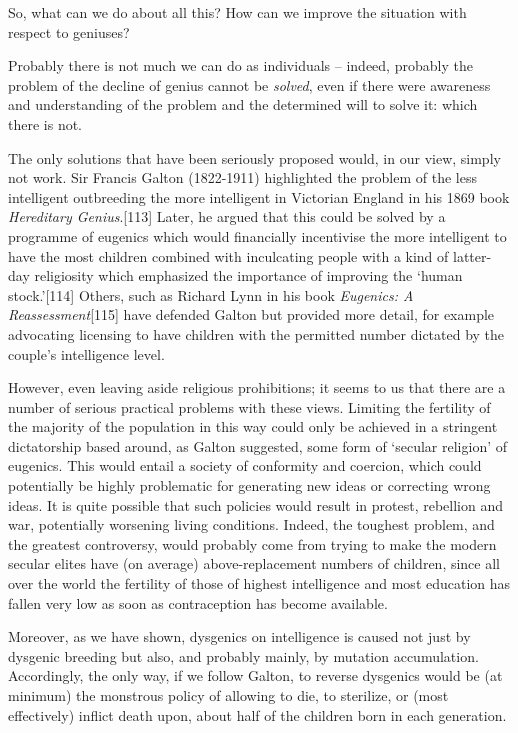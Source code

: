 \documentclass[
]{book}
\begin{document}
So, what can we do about all this? How can we improve the situation with respect to geniuses?

Probably there is not much we can do as individuals -- indeed, probably the problem of the decline of genius cannot be \emph{solved}, even if there were awareness and understanding of the problem and the determined will to solve it: which there is not.

The only solutions that have been seriously proposed would, in our view, simply not work. Sir Francis Galton (1822-1911) highlighted the problem of the less intelligent outbreeding the more intelligent in Victorian England in his 1869 book \emph{Hereditary Genius}.{[}113{]} Later, he argued that this could be solved by a programme of eugenics which would financially incentivise the more intelligent to have the most children combined with inculcating people with a kind of latter-day religiosity which emphasized the importance of improving the `human stock.'{[}114{]} Others, such as Richard Lynn in his book \emph{Eugenics: A Reassessment}{[}115{]} have defended Galton but provided more detail, for example advocating licensing to have children with the permitted number dictated by the couple's intelligence level.

However, even leaving aside religious prohibitions; it seems to us that there are a number of serious practical problems with these views. Limiting the fertility of the majority of the population in this way could only be achieved in a stringent dictatorship based around, as Galton suggested, some form of `secular religion' of eugenics. This would entail a society of conformity and coercion, which could potentially be highly problematic for generating new ideas or correcting wrong ideas. It is quite possible that such policies would result in protest, rebellion and war, potentially worsening living conditions. Indeed, the toughest problem, and the greatest controversy, would probably come from trying to make the modern secular elites have (on average) above-replacement numbers of children, since all over the world the fertility of those of highest intelligence and most education has fallen very low as soon as contraception has become available.

Moreover, as we have shown, dysgenics on intelligence is caused not just by dysgenic breeding but also, and probably mainly, by mutation accumulation. Accordingly, the only way, if we follow Galton, to reverse dysgenics would be (at minimum) the monstrous policy of allowing to die, to sterilize, or (most effectively) inflict death upon, about half of the children born in each generation.
\end{document}
